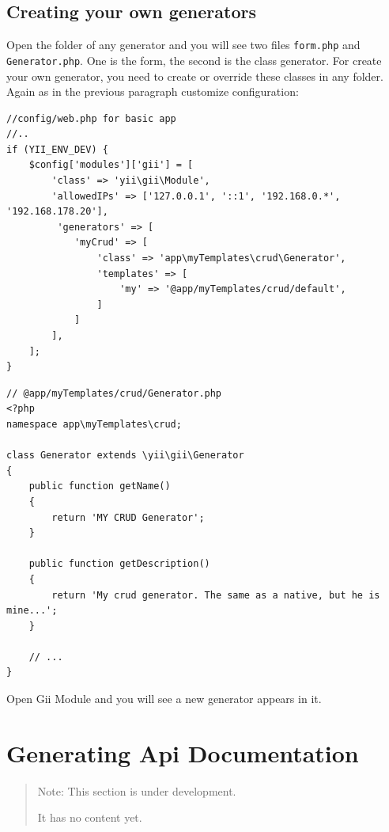 \subsection{Creating your own generators}
Open the folder of any generator and you will see two files \lstinline|form.php| and \lstinline|Generator.php|.
One is the form, the second is the class generator. For create your own generator, you need to create or
override these classes in any folder. Again as in the previous paragraph customize configuration:

\lstset{language=php}\begin{lstlisting}
//config/web.php for basic app
//..
if (YII_ENV_DEV) {    
    $config['modules']['gii'] = [
        'class' => 'yii\gii\Module',      
        'allowedIPs' => ['127.0.0.1', '::1', '192.168.0.*', '192.168.178.20'],  
         'generators' => [
            'myCrud' => [
                'class' => 'app\myTemplates\crud\Generator',
                'templates' => [
                    'my' => '@app/myTemplates/crud/default',
                ]
            ]
        ],
    ];
}
\end{lstlisting}
\lstset{language=php}\begin{lstlisting}
// @app/myTemplates/crud/Generator.php
<?php
namespace app\myTemplates\crud;

class Generator extends \yii\gii\Generator
{
    public function getName()
    {
        return 'MY CRUD Generator';
    }

    public function getDescription()
    {
        return 'My crud generator. The same as a native, but he is mine...';
    }
    
    // ...
}
\end{lstlisting}
Open Gii Module and you will see a new generator appears in it.



\label{tool-api-doc.md}\section{Generating Api Documentation}
\begin{quote}Note: This section is under development.

It has no content yet.

\end{quote}


